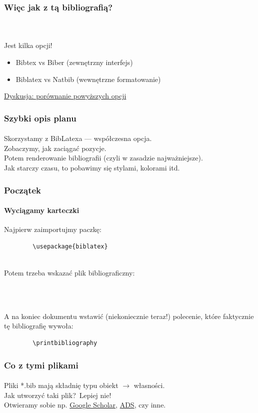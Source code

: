 \documentclass[14pt,compress,usenames,dvipsnames,aspectratio=169]{beamer}
\begin{document}
\begin{frame}[c]
	\frametitle{Więc jak z tą bibliografią?}\pause\\
	\framesubtitle{}
	Jest kilka opcji!\pause\\
	\begin{itemize}
		\item Bibtex vs Biber (zewnętrzny interfejs)
		\item Biblatex vs Natbib (wewnętrzne formatowanie)
	\end{itemize}

\href{https://tex.stackexchange.com/questions/25701/bibtex-vs-biber-and-biblatex-vs-natbib}{Dyskusja: porównanie powyższych opcji} 
\end{frame}

\begin{frame}[c]
	\frametitle{Szybki opis planu}
	\framesubtitle{}
	Skorzystamy z BibLatexa --- współczesna opcja.\pause\\

	Zobaczymy, jak zaciągać pozycje. \pause\\

	Potem renderowanie bibliografii (czyli w zasadzie najważniejsze).\pause\\

	Jak starczy czasu, to pobawimy się stylami, kolorami itd.


\end{frame}

\begin{frame}[fragile,t]
	\frametitle{Początek}
	\framesubtitle{Wyciągamy karteczki}

	Najpierw zaimportujmy paczkę:

	\begin{lstlisting}
		\usepackage{biblatex}
	\end{lstlisting}\pause\\
Potem trzeba wskazać plik bibliograficzny:
	\begin{lstlisting}
		
	\end{lstlisting}\pause\\
A na koniec dokumentu wstawić (niekoniecznie teraz!) polecenie, które faktycznie tę bibliografię wywoła:
	\begin{lstlisting}
		\printbibliography
	\end{lstlisting}
\end{frame}

\begin{frame}[c]
	\frametitle{Co z tymi plikami}
	\framesubtitle{}
	Pliki *.bib mają składnię typu obiekt $\to$ własności.\pause\\
	Jak utworzyć taki plik?\pause~Lepiej nie!\pause\\
	Otwieramy sobie np. \href{https://scholar.google.com/}{Google Scholar}, \href{https://ui.adsabs.harvard.edu/}{ADS}, czy inne.
\end{frame}
\end{document}
